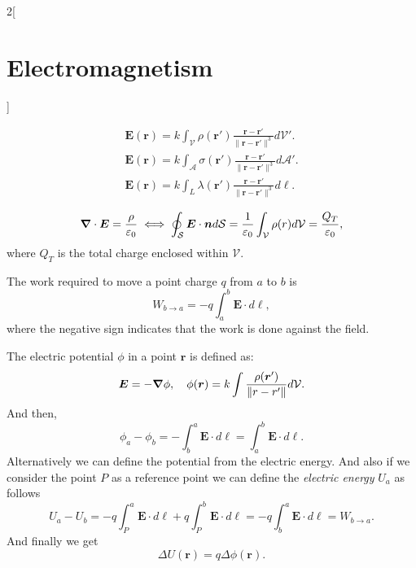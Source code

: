 \documentclass[../../../main.tex]{subfiles}
\begin{document}
\begin{multicols}{2}[\section{Electromagnetism}]
\begin{concept}
    \begin{gather*}
      \boldsymbol{E}(\boldsymbol{r})=k\int_\mathcal{V}\rho(\boldsymbol{r}')\frac{\boldsymbol{r}-\boldsymbol{r}'}{\|\boldsymbol{r}-\boldsymbol{r}'\|^3}d\mathcal{V}'.\\
      \boldsymbol{E}(\boldsymbol{r})=k\int_\mathcal{A}\sigma(\boldsymbol{r}')\frac{\boldsymbol{r}-\boldsymbol{r}'}{\|\boldsymbol{r}-\boldsymbol{r}'\|^3}d\mathcal{A}'.\\
      \boldsymbol{E}(\boldsymbol{r})=k\int_L\lambda(\boldsymbol{r}')\frac{\boldsymbol{r}-\boldsymbol{r}'}{\|\boldsymbol{r}-\boldsymbol{r}'\|^3}d\ell.
    \end{gather*}
  \end{concept}
  \begin{concept}
    \begin{equation}
      \grad\cdot\boldsymbol{E}=\frac{\rho}{\varepsilon_0}\iff\oint_\mathcal{S}\boldsymbol{E}\cdot\boldsymbol{n}d\mathcal{S}=\frac{1}{\varepsilon_0}\int_\mathcal{V}\rho(r)d\mathcal{V}=\frac{Q_T}{\varepsilon_0},
      \label{gauss}
    \end{equation} where $Q_T$ is the total charge enclosed within $\mathcal{V}$.
  \end{concept}
  \begin{concept}[Work]
    The work required to move a point charge $q$ from $a$ to $b$ is $$W_{b\to a}=-q\int_a^b\boldsymbol{E}\cdot d\ell,$$ where the negative sign indicates that the work is done against the field.
  \end{concept}
  \begin{concept}
    The electric potential $\phi$ in a point $\boldsymbol{r}$ is defined as:
    \begin{equation}
      \boldsymbol{E}=-\grad\phi,\quad\phi(\boldsymbol{r})=k\int\frac{\rho(\boldsymbol{r}')}{\|r-r'\|}d\mathcal{V}.
      \label{potential}
    \end{equation} And then, $$\phi_a-\phi_b=-\int_b^a\boldsymbol{E}\cdot d\ell=\int_a^b\boldsymbol{E}\cdot d\ell.$$ Alternatively we can define the potential from the electric energy.  And also if we consider the point $P$ as a reference point we can define the \textit{electric energy} $U_a$ as follows $$U_a-U_b=-q\int_P^a\boldsymbol{E}\cdot d\ell+q\int_P^b\boldsymbol{E}\cdot d\ell=-q\int_b^a\boldsymbol{E}\cdot d\ell=W_{b\to a}.$$ And finally we get $$\Delta U(\boldsymbol{r})=q\Delta\phi(\boldsymbol{r}).$$
  \end{concept}
  \begin{concept}

\end{concept}
\end{multicols}
\end{document}
